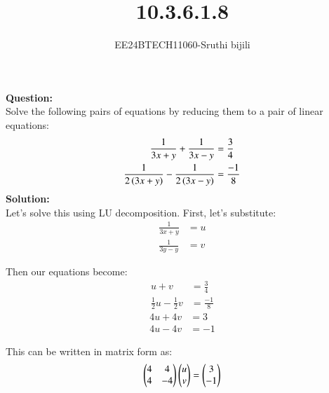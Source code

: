 \documentclass[journal]{IEEEtran}
\begin{document}

\vspace{3cm}

\title{10.3.6.1.8}
\author{EE24BTECH11060-Sruthi bijili}
{\let\newpage\relax\maketitle}
\textbf{Question:}\\
Solve the following pairs of equations by reducing them to a pair of linear equations:
\begin{align*}
    \frac{1}{3x+y} + \frac{1}{3x-y} &= \frac{3}{4}\\
    \frac{1}{2\left(3x+y\right)} - \frac{1}{2\left(3x-y\right)} &= \frac{-1}{8}
\end{align*}
\textbf{Solution:}\\
Let's solve this using LU decomposition. First, let's substitute:
\begin{align}
    \frac{1}{3x+y} &= u\\
    \frac{1}{3y-y} &= v
\end{align}

Then our equations become:
\begin{align}
    u + v &= \frac{3}{4} \label{eq1}\\
    \frac{1}{2}u - \frac{1}{2}v &= \frac{-1}{8} \label{eq2}
\end{align}
\begin{align}
    4u + 4v &= 3 \label{eq1}\\
    4u - 4v &= -1 \label{eq2}
\end{align}


This can be written in matrix form as:
\begin{align}
    \begin{pmatrix}4 & 4 \\ 4& -4\end{pmatrix}\begin{pmatrix}u\\v\end{pmatrix} = \begin{pmatrix}3\\-1\end{pmatrix}
\end{align}
\end{document}
